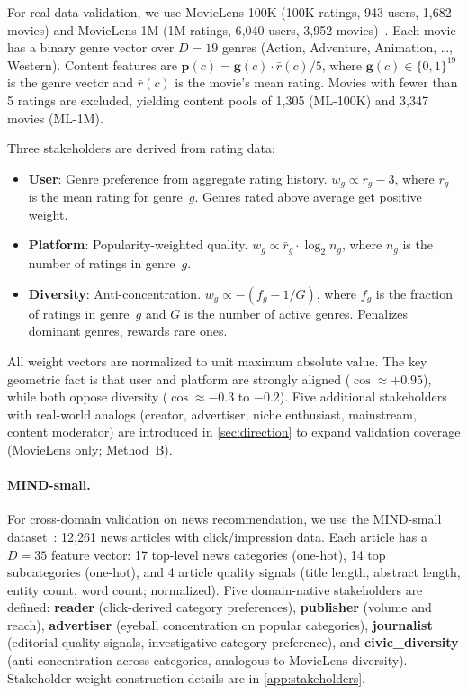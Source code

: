 \documentclass[11pt,letterpaper]{article}
\begin{document}
For real-data validation, we use MovieLens-100K (100K ratings, 943
users, 1{,}682 movies) and MovieLens-1M (1M ratings, 6{,}040 users,
3{,}952 movies)~\cite{harper2015movielens}. Each movie has a binary
genre vector over $D = 19$ genres (Action, Adventure, Animation,
\ldots, Western). Content features are
$\mathbf{p}(c) = \mathbf{g}(c) \cdot \bar{r}(c)/5$, where
$\mathbf{g}(c) \in \{0,1\}^{19}$ is the genre vector and
$\bar{r}(c)$ is the movie's mean rating. Movies with fewer than 5
ratings are excluded, yielding content pools of 1{,}305 (ML-100K)
and 3{,}347 movies (ML-1M).

Three stakeholders are derived from rating data:
\begin{itemize}
  \item \textbf{User}: Genre preference from aggregate rating
    history. $w_g \propto \bar{r}_g - 3$, where $\bar{r}_g$ is the
    mean rating for genre~$g$. Genres rated above average get
    positive weight.
  \item \textbf{Platform}: Popularity-weighted quality.
    $w_g \propto \bar{r}_g \cdot \log_2 n_g$, where $n_g$ is the
    number of ratings in genre~$g$.
  \item \textbf{Diversity}: Anti-concentration.
    $w_g \propto -(f_g - 1/G)$, where $f_g$ is the fraction of
    ratings in genre~$g$ and $G$ is the number of active genres.
    Penalizes dominant genres, rewards rare ones.
\end{itemize}
All weight vectors are normalized to unit maximum absolute value.
The key geometric fact is that user and platform are
strongly aligned ($\cos \approx +0.95$), while both oppose diversity
($\cos \approx -0.3$ to $-0.2$). Five additional stakeholders with
real-world analogs (creator, advertiser, niche enthusiast,
mainstream, content moderator) are introduced in \cref{sec:direction}
to expand validation coverage (MovieLens only; Method~B).

\paragraph{MIND-small.}

For cross-domain validation on news recommendation, we use the
MIND-small dataset~\cite{wu2020mind}: 12{,}261 news articles with
click/impression data. Each article has a $D = 35$ feature vector:
17 top-level news categories (one-hot), 14 top subcategories
(one-hot), and 4 article quality signals (title length, abstract
length, entity count, word count; normalized). Five domain-native
stakeholders are defined:
\textbf{reader} (click-derived category preferences),
\textbf{publisher} (volume and reach),
\textbf{advertiser} (eyeball concentration on popular categories),
\textbf{journalist} (editorial quality signals, investigative
category preference), and
\textbf{civic\_diversity} (anti-concentration across categories,
analogous to MovieLens diversity).
Stakeholder weight construction details are in \cref{app:stakeholders}.
\end{document}
